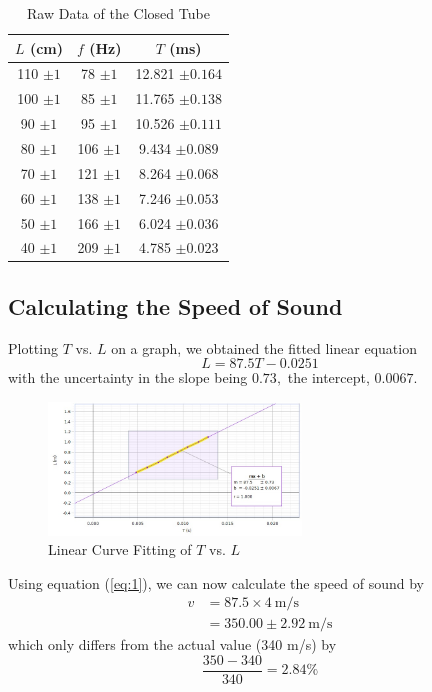 \begin{table}
	\centering
\begin{tabular}{|c|c|c|}
	\hline 
	$L$ (cm) & $f$ (Hz) & $T$ (ms) \\ 
	\hline 
	110 $\pm 1$ & 78 $\pm 1$ & 12.821 $\pm 0.164$ \\ 
	\hline 
	100 $\pm 1$ & 85 $\pm 1$ & 11.765 $\pm 0.138$ \\ 
	\hline 
	90 $\pm 1$ & 95 $\pm 1$ &  10.526 $\pm 0.111$\\ 
	\hline 
	80 $\pm 1$ & 106 $\pm 1$ & 9.434 $\pm 0.089$ \\ 
	\hline 
	70 $\pm 1$ & 121 $\pm 1$ & 8.264 $\pm 0.068$\\ 
	\hline 
	60 $\pm 1$ & 138 $\pm 1$ & 7.246 $\pm 0.053$ \\ 
	\hline 
	50 $\pm 1$ & 166 $\pm 1$ & 6.024 $\pm 0.036$ \\ 
	\hline 
	40 $\pm 1$ & 209 $\pm 1$ & 4.785 $\pm 0.023$ \\ 
	\hline
\end{tabular}
\caption{Raw Data of the Closed Tube}
\label{tab1}
\end{table}




\subsection{Calculating the Speed of Sound}
Plotting $T$ vs. $L$ on a graph, we obtained the fitted linear equation
$$
L = 87.5T - 0.0251
$$
with the uncertainty in the slope being $0.73,$ the intercept, $0.0067.$
\begin{figure}[!htb]
	\center\includegraphics[width=0.6\textwidth]{lin}
	\caption{Linear Curve Fitting of $T$ vs. $L$}
\end{figure}


Using equation (\ref{eq:1}), we can now calculate the speed of sound by
$$
\begin{aligned}
v &= 87.5\times4\ \text{m/s}\\
&=350.00\pm{2.92}\ \text{m/s}
\end{aligned}
$$
which only differs from the actual value (340 m/s) by
$$
\frac{350-340}{340}=2.84\%
$$
